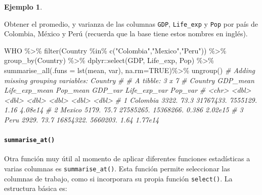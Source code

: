 \documentclass[
]{article}
\newenvironment{Shaded}{\begin{snugshade}}{\end{snugshade}}
\newcommand{\AttributeTok}[1]{\textcolor[rgb]{0.77,0.63,0.00}{#1}}
\newcommand{\CommentTok}[1]{\textcolor[rgb]{0.56,0.35,0.01}{\textit{#1}}}
\newcommand{\ConstantTok}[1]{\textcolor[rgb]{0.00,0.00,0.00}{#1}}
\newcommand{\FunctionTok}[1]{\textcolor[rgb]{0.00,0.00,0.00}{#1}}
\newcommand{\NormalTok}[1]{#1}
\newcommand{\SpecialCharTok}[1]{\textcolor[rgb]{0.00,0.00,0.00}{#1}}
\newcommand{\StringTok}[1]{\textcolor[rgb]{0.31,0.60,0.02}{#1}}
\theoremstyle{definition}
\theoremstyle{definition}
\newtheorem{example}{Ejemplo}[section]
\theoremstyle{definition}
\theoremstyle{definition}
\theoremstyle{remark}
\begin{document}
\begin{example}
\protect\hypertarget{exm:summariseall}{}\label{exm:summariseall}

Obtener el promedio, y varianza de las columnas \texttt{GDP}, \texttt{Life\_exp} y \texttt{Pop} por país de Colombia, México y Perú (recuerda que la base tiene estos nombres en inglés).

\begin{Shaded}
\begin{Highlighting}[]
\NormalTok{WHO }\SpecialCharTok{\%\textgreater{}\%} 
  \FunctionTok{filter}\NormalTok{(Country }\SpecialCharTok{\%in\%} \FunctionTok{c}\NormalTok{(}\StringTok{"Colombia"}\NormalTok{,}\StringTok{"Mexico"}\NormalTok{,}\StringTok{"Peru"}\NormalTok{)) }\SpecialCharTok{\%\textgreater{}\%} 
  \FunctionTok{group\_by}\NormalTok{(Country) }\SpecialCharTok{\%\textgreater{}\%} 
\NormalTok{  dplyr}\SpecialCharTok{::}\FunctionTok{select}\NormalTok{(GDP, Life\_exp, Pop) }\SpecialCharTok{\%\textgreater{}\%} 
  \FunctionTok{summarise\_all}\NormalTok{(}\AttributeTok{.funs =} \FunctionTok{lst}\NormalTok{(mean, var), }
                \AttributeTok{na.rm=}\ConstantTok{TRUE}\NormalTok{)}\SpecialCharTok{\%\textgreater{}\%} 
  \FunctionTok{ungroup}\NormalTok{()}
\CommentTok{\# Adding missing grouping variables: \textasciigrave{}Country\textasciigrave{}}
\CommentTok{\# \# A tibble: 3 x 7}
\CommentTok{\#   Country  GDP\_mean Life\_exp\_mean  Pop\_mean   GDP\_var Life\_exp\_var Pop\_var}
\CommentTok{\#   \textless{}chr\textgreater{}       \textless{}dbl\textgreater{}         \textless{}dbl\textgreater{}     \textless{}dbl\textgreater{}     \textless{}dbl\textgreater{}        \textless{}dbl\textgreater{}   \textless{}dbl\textgreater{}}
\CommentTok{\# 1 Colombia    3322.          73.3 31767433.  7555129.        1.16  4.08e14}
\CommentTok{\# 2 Mexico      5179.          75.7 27585265. 15368266.        0.386 2.02e15}
\CommentTok{\# 3 Peru        2929.          73.7 16854322.  5660203.        1.64  1.77e14}
\end{Highlighting}
\end{Shaded}

\end{example}

\hypertarget{summarise_at}{%
\paragraph{\texorpdfstring{\texttt{summarise\_at()}}{summarise\_at()}}\label{summarise_at}}

Otra función muy útil al momento de aplicar diferentes funciones estadísticas a varias columnas es \texttt{summarise\_at()}. Esta función permite seleccionar las columnas de trabajo, como si incorporara su propia función \texttt{select()}. La estructura básica es:
\end{document}
